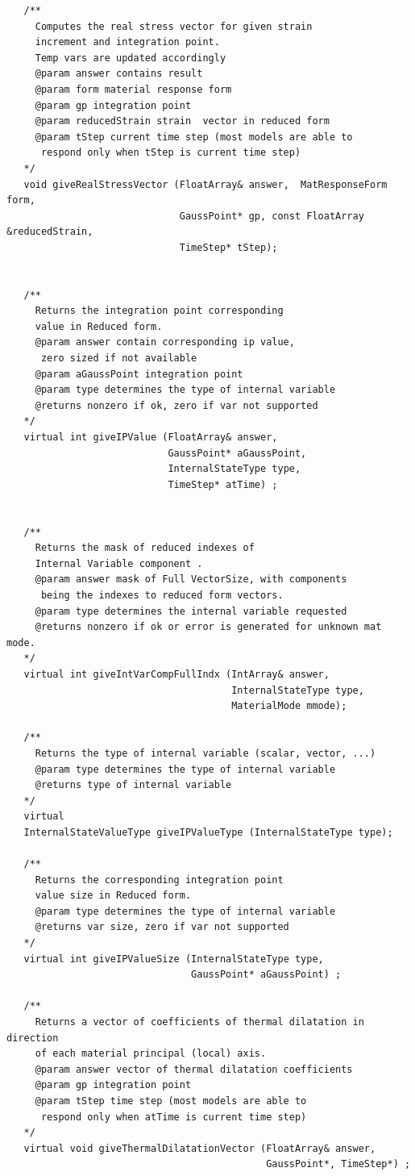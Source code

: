 \documentclass[a4paper]{article}
\begin{document}
{\begin{verbatim}
   /**
     Computes the real stress vector for given strain 
     increment and integration point. 
     Temp vars are updated accordingly
     @param answer contains result
     @param form material response form
     @param gp integration point 
     @param reducedStrain strain  vector in reduced form
     @param tStep current time step (most models are able to 
      respond only when tStep is current time step)
   */
   void giveRealStressVector (FloatArray& answer,  MatResponseForm form, 
                              GaussPoint* gp, const FloatArray &reducedStrain, 
                              TimeStep* tStep);


   /**
     Returns the integration point corresponding 
     value in Reduced form.
     @param answer contain corresponding ip value, 
      zero sized if not available
     @param aGaussPoint integration point
     @param type determines the type of internal variable
     @returns nonzero if ok, zero if var not supported
   */
   virtual int giveIPValue (FloatArray& answer, 
                            GaussPoint* aGaussPoint, 
                            InternalStateType type, 
                            TimeStep* atTime) ;


   /**
     Returns the mask of reduced indexes of 
     Internal Variable component .
     @param answer mask of Full VectorSize, with components 
      being the indexes to reduced form vectors.
     @param type determines the internal variable requested
     @returns nonzero if ok or error is generated for unknown mat mode.
   */
   virtual int giveIntVarCompFullIndx (IntArray& answer, 
                                       InternalStateType type, 
                                       MaterialMode mmode);

   /**
     Returns the type of internal variable (scalar, vector, ...)
     @param type determines the type of internal variable
     @returns type of internal variable
   */
   virtual 
   InternalStateValueType giveIPValueType (InternalStateType type);

   /**
     Returns the corresponding integration point  
     value size in Reduced form.
     @param type determines the type of internal variable
     @returns var size, zero if var not supported
   */
   virtual int giveIPValueSize (InternalStateType type, 
                                GaussPoint* aGaussPoint) ;

   /**
     Returns a vector of coefficients of thermal dilatation in direction
     of each material principal (local) axis.
     @param answer vector of thermal dilatation coefficients
     @param gp integration point
     @param tStep time step (most models are able to 
      respond only when atTime is current time step)
   */
   virtual void giveThermalDilatationVector (FloatArray& answer, 
                                             GaussPoint*, TimeStep*) ;




\end{verbatim}}
\end{document}
